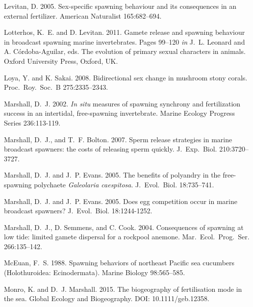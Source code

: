 \documentclass{article}
\begin{document}
\begin{thebibliography}{}
Levitan, D. 2005.
\newblock Sex-specific spawning behaviour and its consequences in an external fertilizer.
\newblock American Naturalist 165:682--694.

Lotterhos, K.~E. and D. Levitan. 2011.
\newblock Gamete release and spawning behaviour in broadcast spawning marine invertebrates.
\newblock Pages 99--120 \emph{in} J.~L. Leonard and A. C\'{o}rdoba-Aguilar, eds. The evolution of primary sexual characters in animals. Oxford University Press, Oxford, UK.

Loya, Y. and K. Sakai. 2008.
\newblock Bidirectional sex change in mushroom stony corals.
\newblock Proc.~Roy.~Soc.~B 275:2335--2343.

Marshall, D.~J. 2002.
\newblock \textit{In situ} measures of spawning synchrony and fertilization success in an intertidal, free-spawning invertebrate.
\newblock Marine Ecology Progress Series 236:113-119.

Marshall, D.~J., and T.~F. Bolton. 2007.
\newblock Sperm release strategies in marine broadcast spawners: the costs of releasing sperm quickly.
\newblock J.~Exp.~Biol. 210:3720--3727.

Marshall, D.~J. and J.~P. Evans. 2005.
\newblock The benefits of polyandry in the free-spawning polychaete \textit{Galeolaria caespitosa}.
\newblock J.~Evol.~Biol. 18:735--741.

Marshall, D.~J. and J.~P. Evans. 2005.
\newblock Does egg competition occur in marine broadcast spawners? 
\newblock J.~Evol.~Biol. 18:1244-1252.

Marshall, D.~J., D. Semmens, and C. Cook. 2004.
\newblock Consequences of spawning at low tide: limited gamete dispersal for a rockpool anemone.
\newblock Mar.~Ecol.~Prog.~Ser. 266:135--142.

McEuan, F.~S. 1988.
\newblock Spawning behaviors of northeast Pacific sea cucumbers (Holothuroidea: Ecinodermata).
\newblock Marine Biology 98:565--585.

Monro, K. and D.~J. Marshall. 2015.
\newblock The biogeography of fertilisation mode in the sea.
\newblock Global Ecology and Biogeography. DOI: 10.1111/geb.12358.


\end{thebibliography}
\end{document}
